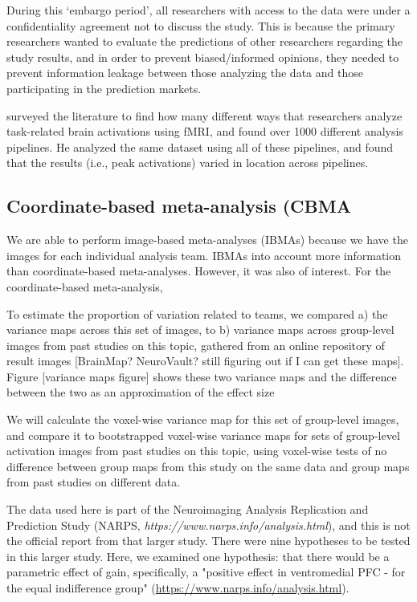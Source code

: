 During this `embargo period', all researchers with access to the data were under a confidentiality agreement not to discuss the study. This is because the primary researchers wanted to evaluate the predictions of other researchers regarding the study results, and in order to prevent biased/informed opinions, they needed to prevent information leakage between those analyzing the data and those participating in the prediction markets. 

 surveyed the literature to find how many different ways that researchers analyze task-related brain activations using fMRI, and found over 1000 different analysis pipelines. He analyzed the same dataset using all of these pipelines, and found that the results (i.e., peak activations) varied in location across pipelines.
 
 \subsection{Coordinate-based meta-analysis (CBMA}

We are able to perform image-based meta-analyses (IBMAs) because we have the images for each individual analysis team. IBMAs into account more information than coordinate-based meta-analyses. However, it was also of interest.
For the coordinate-based meta-analysis, 





To estimate the proportion of variation related to teams, we compared a) the variance maps across this set of images, to b) variance maps across group-level images from past studies on this topic, gathered from an online repository of result images [BrainMap? NeuroVault? still figuring out if I can get these maps]. Figure [variance maps figure] shows these two variance maps and the difference between the two as an approximation of the effect size 



We will calculate the voxel-wise variance map for this set of group-level images, and compare it to bootstrapped voxel-wise variance maps for sets of group-level activation images from past studies on this topic, using voxel-wise tests of no difference between group maps from this study on the same data and group maps from past studies on different data. 

The data used here is part of the Neuroimaging Analysis Replication and Prediction Study (NARPS, \textit{https://www.narps.info/analysis.html}), and this is not the official report from that larger study. There were nine hypotheses to be tested in this larger study. Here, we examined one hypothesis: that there would be a parametric effect of gain, specifically, a "positive effect in ventromedial PFC - for the equal indifference group" (\url{https://www.narps.info/analysis.html}).




